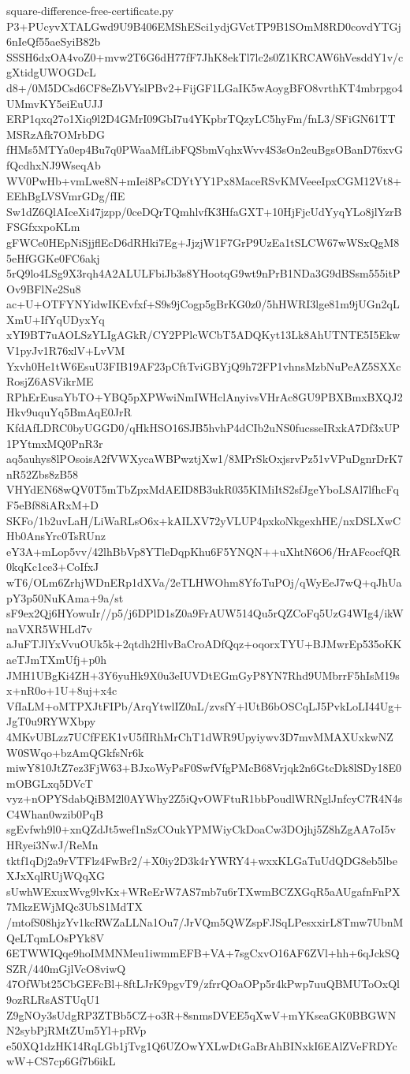 \documentclass[11pt]{article}
\theoremstyle{definition}
\theoremstyle{remark}
\begin{document}
\begin{filecontents*}[overwrite]{square-difference-free-certificate.py}
P3+PUcyvXTALGwd9U9B406EMShESci1ydjGVctTP9B1SOmM8RD0covdYTGj6nIeQf55aeSyiB82b
SSSH6dxOA4voZ0+mvw2T6G6dH77fF7JhK8ekTl7lc2s0Z1KRCAW6hVesddY1v/cgXtidgUWOGDcL
d8+/0M5DCsd6CF8eZbVYslPBv2+FijGF1LGaIK5wAoygBFO8vrthKT4mbrpgo4UMmvKY5eiEuUJJ
ERP1qxq27o1Xiq9l2D4GMrI09GbI7u4YKpbrTQzyLC5hyFm/fnL3/SFiGN61TTMSRzAfk7OMrbDG
fHMs5MTYa0ep4Bu7q0PWaaMfLibFQSbmVqhxWvv4S3sOn2euBgsOBanD76xvGfQcdhxNJ9WseqAb
WV0PwHb+vmLwe8N+mIei8PsCDYtYY1Px8MaceRSvKMVeeeIpxCGM12Vt8+EEhBgLVSVmrGDg/fIE
Sw1dZ6QlAIceXi47jzpp/0ceDQrTQmhlvfK3HfaGXT+10HjFjcUdYyqYLo8jlYzrBFSGfxxpoKLm
gFWCe0HEpNiSjjflEcD6dRHki7Eg+JjzjW1F7GrP9UzEa1tSLCW67wWSxQgM85eHfGGKe0FC6akj
5rQ9lo4LSg9X3rqh4A2ALULFbiJb3s8YHootqG9wt9nPrB1NDa3G9dBSsm555itPOv9BFlNe2Su8
ac+U+OTFYNYidwIKEvfxf+S9s9jCogp5gBrKG0z0/5hHWRI3lge81m9jUGn2qLXmU+IfYqUDyxYq
xYI9BT7uAOLSzYLIgAGkR/CY2PPlcWCbT5ADQKyt13Lk8AhUTNTE5I5EkwV1pyJv1R76xlV+LvVM
Yxvh0He1tW6EsuU3FIB19AF23pCftTviGBYjQ9h72FP1vhnsMzbNuPeAZ5SXXcRosjZ6ASVikrME
RPhErEusaYbTO+YBQ5pXPWwiNmIWHclAnyivsVHrAc8GU9PBXBmxBXQJ2Hkv9uquYq5BmAqE0JrR
KfdAfLDRC0byUGGD0/qHkHSO16SJB5hvhP4dCIb2uNS0fucsseIRxkA7Df3xUP1PYtmxMQ0PnR3r
aq5auhys8lPOsoisA2fVWXycaWBPwztjXw1/8MPrSkOxjsrvPz51vVPuDgnrDrK7nR52Zbs8zB58
VHYdEN68wQV0T5mTbZpxMdAEID8B3ukR035KIMiItS2sfJgeYboLSAl7lfhcFqF5eBf88iARxM+D
SKFo/1b2uvLaH/LiWaRLsO6x+kAILXV72yVLUP4pxkoNkgexhHE/nxDSLXwCHb0AnsYrc0TsRUnz
eY3A+mLop5vv/42lhBbVp8YTleDqpKhu6F5YNQN++uXhtN6O6/HrAFcocfQR0kqKc1ce3+CoIfxJ
wT6/OLm6ZrhjWDnERp1dXVa/2eTLHWOhm8YfoTuPOj/qWyEeJ7wQ+qJhUapY3p50NuKAma+9a/st
sF9ex2Qj6HYowuIr//p5/j6DPlD1sZ0a9FrAUW514Qu5rQZCoFq5UzG4WIg4/ikWnaVXR5WHLd7v
aJuFTJlYxVvuOUk5k+2qtdh2HlvBaCroADfQqz+oqorxTYU+BJMwrEp535oKKaeTJmTXmUfj+p0h
JMH1UBgKi4ZH+3Y6yuHk9X0u3eIUVDtEGmGyP8YN7Rhd9UMbrrF5hIsM19sx+nR0o+1U+8uj+x4c
VfIaLM+oMTPXJtFIPb/ArqYtwlIZ0nL/zvsfY+lUtB6bOSCqLJ5PvkLoLI44Ug+JgT0u9RYWXbpy
4MKvUBLzz7UCfFEK1vU5fIRhMrChT1dWR9Upyiywv3D7mvMMAXUxkwNZW0SWqo+bzAmQGkfsNr6k
miwY810JtZ7ez3FjW63+BJxoWyPsF0SwfVfgPMcB68Vrjqk2n6GtcDk8lSDy18E0mOBGLxq5DVcT
vyz+nOPYSdabQiBM2l0AYWhy2Z5iQvOWFtuR1bbPoudlWRNglJnfcyC7R4N4sC4Whan0wzib0PqB
sgEvfwh9l0+xnQZdJt5wef1nSzCOukYPMWiyCkDoaCw3DOjhj5Z8hZgAA7oI5vHRyei3NwJ/ReMn
tktf1qDj2a9rVTFlz4FwBr2/+X0iy2D3k4rYWRY4+wxxKLGaTuUdQDG8eb5lbeXJxXqlRUjWQqXG
sUwhWExuxWvg9lvKx+WReErW7AS7mb7u6rTXwmBCZXGqR5aAUgafnFnPX7MkzEWjMQc3UbS1MdTX
/mtofS08hjzYv1kcRWZaLLNa1Ou7/JrVQm5QWZspFJSqLPesxxirL8Tmw7UbnMQeLTqmLOsPYk8V
6ETWWIQqe9hoIMMNMeu1iwmmEFB+VA+7sgCxvO16AF6ZVl+hh+6qJckSQSZR/440mGjlVcO8viwQ
47OfWbt25CbGEFcBl+8ftLJrK9pgvT9/zfrrQOaOPp5r4kPwp7uuQBMUToOxQl9ozRLRsASTUqU1
Z9gNOy3sUdgRP3ZTBb5CZ+o3R+8snmsDVEE5qXwV+mYKseaGK0BBGWNN2sybPjRMtZUm5Yl+pRVp
e50XQ1dzHK14RqLGb1jTvg1Q6UZOwYXLwDtGaBrAhBINxkI6EAlZVeFRDYcwW+CS7cp6Gf7b6ikL

\end{filecontents*}
\end{document}
